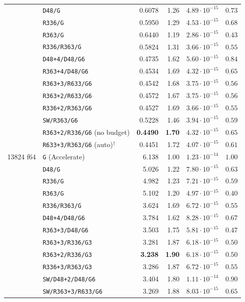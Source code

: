 \documentclass[11pt]{article}
\newcommand{\lv}[1]{\texttt{#1}}
\begin{document}
\begin{table}[tp]
\begin{tabular}{llrrrr}
 & \lv{D48/G} & 0.6078 & 1.26 & $4.89\cdot10^{-15}$ & $0.73$\\
 & \lv{R336/G} & 0.5950 & 1.29 & $4.53\cdot10^{-15}$ & $0.68$\\
 & \lv{R363/G} & 0.6440 & 1.19 & $2.86\cdot10^{-15}$ & $0.43$\\
 & \lv{R336/R363/G} & 0.5824 & 1.31 & $3.66\cdot10^{-15}$ & $0.55$\\
 & \lv{D48+4/D48/G6} & 0.4735 & 1.62 & $5.60\cdot10^{-15}$ & $0.84$\\
 & \lv{R363+4/D48/G6} & 0.4534 & 1.69 & $4.32\cdot10^{-15}$ & $0.65$\\
 & \lv{R363+3/R633/G6} & 0.4542 & 1.68 & $3.75\cdot10^{-15}$ & $0.56$\\
 & \lv{R363+2/R633/G6} & 0.4572 & 1.67 & $3.75\cdot10^{-15}$ & $0.56$\\
 & \lv{R336+2/R363/G6} & 0.4527 & 1.69 & $3.66\cdot10^{-15}$ & $0.55$\\
 & \lv{SW/R363/G6} & 0.5228 & 1.46 & $3.94\cdot10^{-15}$ & $0.59$\\
 & \lv{R363+2/R336/G6} (no budget) & \textbf{0.4490} & \textbf{1.70} & $4.32\cdot10^{-15}$ & $0.65$\\
\rowcolor{cR!12} & \lv{R633+3/R363/G6} (auto)$^\dagger$ & 0.4451 & 1.72 & $4.07\cdot10^{-15}$ & $0.61$\\
\midrule
13824 f64 & \lv{G} (Accelerate) & 6.138 & 1.00 & $1.23\cdot10^{-14}$ & $1.00$\\
 & \lv{D48/G} & 5.026 & 1.22 & $7.80\cdot10^{-15}$ & $0.63$\\
 & \lv{R336/G} & 4.982 & 1.23 & $7.21\cdot10^{-15}$ & $0.59$\\
 & \lv{R363/G} & 5.102 & 1.20 & $4.97\cdot10^{-15}$ & $0.40$\\
 & \lv{R336/R363/G} & 3.624 & 1.69 & $6.72\cdot10^{-15}$ & $0.55$\\
 & \lv{D48+4/D48/G6} & 3.784 & 1.62 & $8.28\cdot10^{-15}$ & $0.67$\\
 & \lv{R363+3/D48/G6} & 3.503 & 1.75 & $5.81\cdot10^{-15}$ & $0.47$\\
 & \lv{R363+3/R336/G3} & 3.281 & 1.87 & $6.18\cdot10^{-15}$ & $0.50$\\
 & \lv{R363+2/R336/G3} & \textbf{3.238} & \textbf{1.90} & $6.18\cdot10^{-15}$ & $0.50$\\
 & \lv{R336+3/R363/G3} & 3.286 & 1.87 & $6.72\cdot10^{-15}$ & $0.55$\\
 & \lv{SW/D48+2/D48/G6} & 3.404 & 1.80 & $1.11\cdot10^{-14}$ & $0.90$\\
 & \lv{SW/R363+3/R633/G6} & 3.269 & 1.88 & $8.03\cdot10^{-15}$ & $0.65$\\

\end{tabular}
\end{table}
\end{document}
